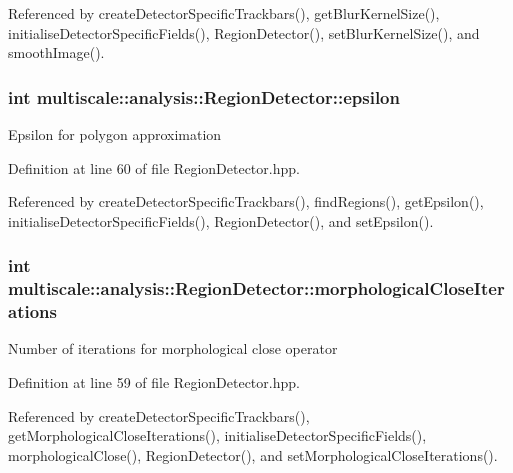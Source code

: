 Referenced by create\-Detector\-Specific\-Trackbars(), get\-Blur\-Kernel\-Size(), initialise\-Detector\-Specific\-Fields(), Region\-Detector(), set\-Blur\-Kernel\-Size(), and smooth\-Image().

\hypertarget{classmultiscale_1_1analysis_1_1RegionDetector_acf21910fadd7c6ef2810743a78a0aeb9}{
\subsubsection[{epsilon}]{\setlength{\rightskip}{0pt plus 5cm}int multiscale\-::analysis\-::\-Region\-Detector\-::epsilon\hspace{0.3cm}{\ttfamily [private]}}}\label{classmultiscale_1_1analysis_1_1RegionDetector_acf21910fadd7c6ef2810743a78a0aeb9}
Epsilon for polygon approximation 

Definition at line 60 of file Region\-Detector.\-hpp.



Referenced by create\-Detector\-Specific\-Trackbars(), find\-Regions(), get\-Epsilon(), initialise\-Detector\-Specific\-Fields(), Region\-Detector(), and set\-Epsilon().

\hypertarget{classmultiscale_1_1analysis_1_1RegionDetector_a700a2f299d7c56fbd1fdbec68092f23a}{
\subsubsection[{morphological\-Close\-Iterations}]{\setlength{\rightskip}{0pt plus 5cm}int multiscale\-::analysis\-::\-Region\-Detector\-::morphological\-Close\-Iterations\hspace{0.3cm}{\ttfamily [private]}}}\label{classmultiscale_1_1analysis_1_1RegionDetector_a700a2f299d7c56fbd1fdbec68092f23a}
Number of iterations for morphological close operator 

Definition at line 59 of file Region\-Detector.\-hpp.



Referenced by create\-Detector\-Specific\-Trackbars(), get\-Morphological\-Close\-Iterations(), initialise\-Detector\-Specific\-Fields(), morphological\-Close(), Region\-Detector(), and set\-Morphological\-Close\-Iterations().

